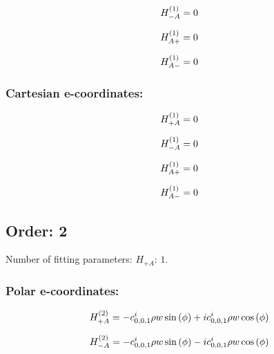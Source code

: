 \documentclass[fleqn]{article}
\begin{document}
\begin{dmath*}
H_{-A}^{(1)}=0\\
\end{dmath*}

\begin{dmath*}
H_{A+}^{(1)}=0\\
\end{dmath*}

\begin{dmath*}
H_{A-}^{(1)}=0\\
\end{dmath*}
\subsubsection*{Cartesian e-coordinates:}

\begin{dmath*}
H_{+A}^{(1)}=0\\
\end{dmath*}

\begin{dmath*}
H_{-A}^{(1)}=0\\
\end{dmath*}

\begin{dmath*}
H_{A+}^{(1)}=0\\
\end{dmath*}

\begin{dmath*}
H_{A-}^{(1)}=0\\
\end{dmath*}
\subsection{Order: 2}
Number of fitting parameters: $H_{+A}$: $1$.
\subsubsection*{Polar e-coordinates:}

\begin{dmath*}
H_{+A}^{(2)}=- c^{i}_{0,0,1} \rho w \sin{\left (\phi \right )} +  i c^{i}_{0,0,1} \rho w \cos{\left (\phi \right )}\\
\end{dmath*}

\begin{dmath*}
H_{-A}^{(2)}=- c^{i}_{0,0,1} \rho w \sin{\left (\phi \right )} -  i c^{i}_{0,0,1} \rho w \cos{\left (\phi \right )}\\
\end{dmath*}
\end{document}
